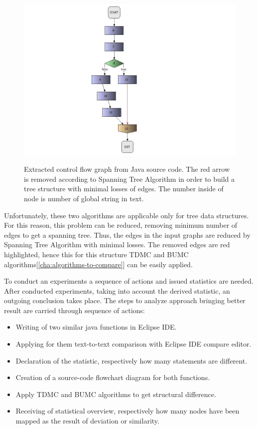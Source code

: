 \documentclass{report}
\begin{document}
\begin{figure}[h]
  \centering
  \includegraphics[scale = 0.5]{Figures/Java-flowchart-exp/control-flow-graph.png}\\[0.1cm]
  \caption[Extracted control flow graph from java source code]{Extracted control flow graph from Java source code. The red arrow is removed according to Spanning Tree Algorithm in order to build a tree structure with minimal losses of edges. The number inside of node is number of global string in text.}
  \label{fig:control-flow-graph}
\end{figure}

Unfortunately, these two algorithms are applicable only for tree data structures. For this reason, this problem can be reduced, removing minimum number of edges to get a spanning tree. Thus, the edges in the input graphs are reduced by Spanning Tree Algorithm with minimal losses. The removed edges are red highlighted, hence this for this structure TDMC and BUMC algorithms[\ref{cha:algorithms-to-compare}] can be easily applied.

To conduct an experiments a sequence of actions and issued statistics are needed. After conducted experiments, taking into account the derived statistic, an outgoing conclusion takes place. The steps to analyze approach bringing better result are carried through sequence of actions:
\begin{itemize}
	\item Writing of two similar java functions in Eclipse IDE.
	\item Applying for them text-to-text comparison with Eclipse IDE compare editor.
	\item Declaration of the statistic, respectively how many statements are different.
	\item Creation of a source-code flowchart diagram for both functions.
	\item Apply TDMC and BUMC algorithms to get structural difference.
	\item Receiving of statistical overview, respectively how many nodes have been  mapped as the result of deviation or similarity.
\end{itemize}
\end{document}
